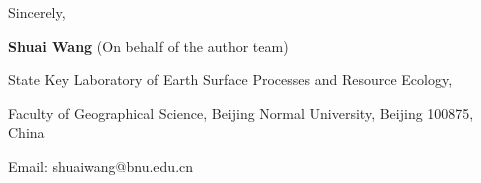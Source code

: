 \documentclass[11pt,a4paper,roman]{moderncv}
\begin{document}

Sincerely,

\textbf{Shuai Wang} (On behalf of the author team)

State Key Laboratory of Earth Surface Processes and Resource Ecology,

Faculty of Geographical Science, Beijing Normal University, Beijing 100875, China

Email: shuaiwang@bnu.edu.cn



\end{document}
